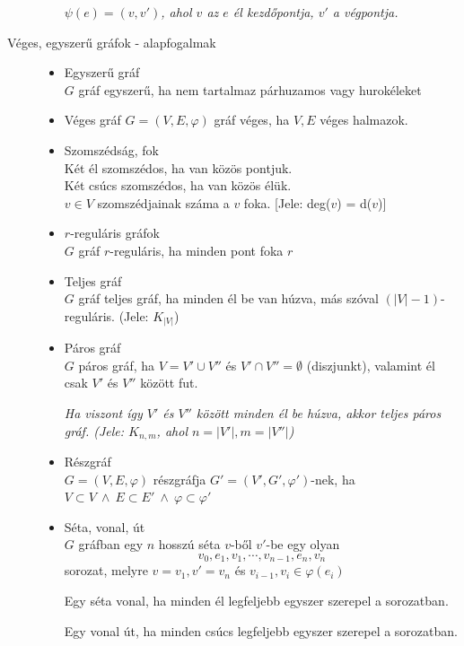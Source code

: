 \documentclass[margin=0px]{article}
\begin{document}
\begin{description}
\begin{itemize}
							\textit{$\psi(e) = (v,v')$, ahol $v$ az $e$ él kezdőpontja, $v'$ a végpontja.}
						\end{itemize}
				\item[Véges, egyszerű gráfok - alapfogalmak] \hfill
					\begin{itemize}	
						\item Egyszerű gráf \\
							$G$ gráf egyszerű, ha nem tartalmaz párhuzamos vagy hurokéleket
						\item Véges gráf
							$G= (V,E,\varphi)$ gráf véges, ha $V,E$ véges halmazok.
						\item Szomszédság, fok\\
							Két él szomszédos, ha van közös pontjuk.\\
							Két csúcs szomszédos, ha van közös élük. \\
							$v\in V$ szomszédjainak száma a $v$ foka. [Jele: deg($v$) = d($v$)]
						\item $r$-reguláris gráfok\\
							$G$ gráf $r$-reguláris, ha minden pont foka $r$
						\item Teljes gráf\\
							$G$ gráf teljes gráf, ha minden él be van húzva, más szóval $(|V|-1)$-reguláris. (Jele: $K_{|V|}$)
						\item Páros gráf\\
							$G$ páros gráf, ha $V = V' \cup V''$ és $V'\cap V'' = \emptyset$ (diszjunkt), valamint él csak $V'$ és $V''$ között fut.
							
							\textit{Ha viszont így $V'$ és $V''$ között minden él be húzva, akkor teljes páros gráf. (Jele: $K_{n,m}$, ahol $n=|V'|, m=|V''|$)}
						\item Részgráf \\
							$G = (V,E,\varphi)$ részgráfja $G'=(V',G',\varphi')$-nek, ha $V\subset V \ \land \ E \subset E' \ \land \ \varphi \subset \varphi'$
						\item Séta, vonal, út \\
							$G$ gráfban egy $n$ hosszú séta $v$-ből $v'$-be egy olyan
							\[v_0,e_1,v_1,\cdots,v_{n-1},e_n,v_n\]
							sorozat, melyre $v=v_1, v'=v_n$ és $v_{i-1},v_{i} \in \varphi(e_i)$ 
							
							Egy séta vonal, ha minden él legfeljebb egyszer szerepel a sorozatban.
							
							Egy vonal út, ha minden csúcs legfeljebb egyszer szerepel a sorozatban.
							

\end{itemize}
\end{description}
\end{document}
